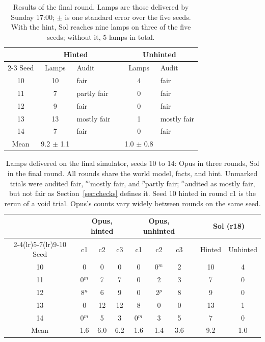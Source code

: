 \documentclass[10pt]{article}
\begin{document}
\begin{table}[h]
  \centering
  \small
  \begin{tabular}{c c l c c l}
    \toprule
    & \multicolumn{2}{c}{Hinted} & & \multicolumn{2}{c}{Unhinted} \\
    \cmidrule{2-3}\cmidrule{5-6}
    Seed & Lamps & Audit & & Lamps & Audit \\
    \midrule
    10 & 10 & fair && 4 & fair \\
    11 & 7 & partly fair && 0 & fair \\
    12 & 9 & fair && 0 & fair \\
    13 & 13 & mostly fair && 1 & mostly fair \\
    14 & 7 & fair && 0 & fair \\
    \midrule
    Mean & 9.2 $\pm$ 1.1 & && 1.0 $\pm$ 0.8 & \\
    \bottomrule
  \end{tabular}
  \caption{Results of the final round. Lamps are those delivered by Sunday 17:00; $\pm$ is one standard error over the
  five seeds. With the hint, Sol reaches nine lamps on three of the five seeds; without it, 5 lamps in total.}
  \label{tab:main}
\end{table}

\begin{table}[h]
  \centering
  \small
  \begin{tabular}{c ccc ccc c cc}
    \toprule
    & \multicolumn{3}{c}{Opus, hinted} & \multicolumn{3}{c}{Opus, unhinted} & & \multicolumn{2}{c}{Sol (r18)} \\
    \cmidrule(lr){2-4}\cmidrule(lr){5-7}\cmidrule(lr){9-10}
    Seed & c1 & c2 & c3 & c1 & c2 & c3 & & Hinted & Unhinted \\
    \midrule
    10 & 0 & 0 & 0 & 0 & 0$^{m}$ & 2 && 10 & 4 \\
    11 & 0$^{m}$ & 7 & 7 & 0 & 2 & 3 && 7 & 0 \\
    12 & 8$^{n}$ & 6 & 9 & 0 & 2$^{p}$ & 8 && 9 & 0 \\
    13 & 0 & 12 & 12 & 8 & 0 & 0 && 13 & 1 \\
    14 & 0$^{m}$ & 5 & 3 & 0$^{m}$ & 3 & 5 && 7 & 0 \\
    \midrule
    Mean & 1.6 & 6.0 & 6.2 & 1.6 & 1.4 & 3.6 && 9.2 & 1.0 \\
    \bottomrule
  \end{tabular}
  \caption{Lamps delivered on the final simulator, seeds 10 to 14: Opus in three rounds, Sol in the final round. All rounds share the world model, facts, and
  hint. Unmarked trials were audited fair, $^{m}$mostly fair, and $^{p}$partly fair; $^{n}$audited as mostly fair, but not fair as Section~\ref{sec:checks} defines it. Seed 10 hinted in round c1 is the rerun of a void trial. Opus's counts vary widely between rounds on the same seed.}
  \label{tab:claude}
\end{table}
\end{document}
